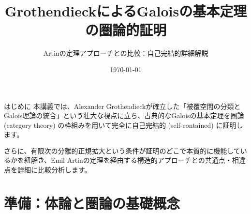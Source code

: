 \documentclass[10pt, unicode]{beamer}
\title{GrothendieckによるGaloisの基本定理の圏論的証明}
\subtitle{Artinの定理アプローチとの比較：自己完結的詳細解説}
\author{}
\date{\today}
\theoremstyle{definition}
\begin{document}
\begin{frame}
    \titlepage
\end{frame}

\begin{frame}
    \tableofcontents
\end{frame}

\begin{frame}{はじめに}
    本講義では、Alexander Grothendieckが確立した「被覆空間の分類とGalois理論の統合」という壮大な視点に立ち、古典的なGaloisの基本定理を圏論 (category theory) の枠組みを用いて完全に自己完結的 (self-contained) に証明します。
    
    さらに、有限次の分離的正規拡大という条件が証明のどこで本質的に機能しているかを紐解き、Emil Artinの定理を経由する構造的アプローチとの共通点・相違点を詳細に比較分析します。
\end{frame}

\section{準備：体論と圏論の基礎概念}
\end{document}
